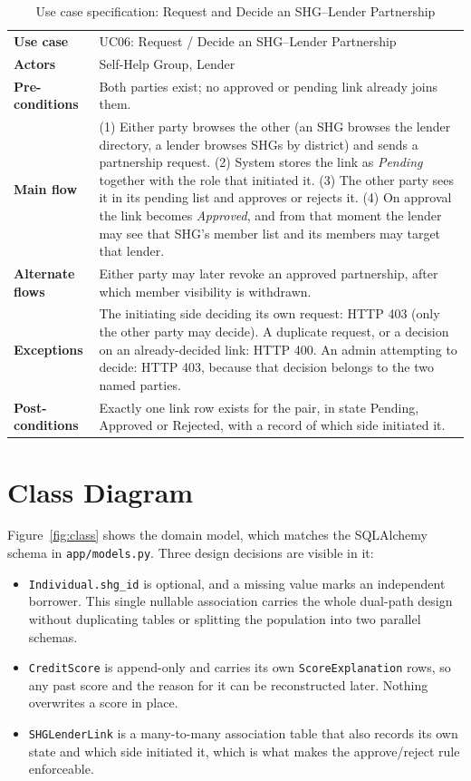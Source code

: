 \documentclass[11pt,a4paper]{article}
\newcommand{\code}[1]{\texttt{\small #1}}
\begin{document}
\begin{table}[H]
\centering
\caption{Use case specification: Request and Decide an SHG--Lender Partnership}
\label{tab:uc6}
\small
\begin{tabular}{@{}L{3.1cm}L{11.3cm}@{}}
\toprule
\textbf{Use case} & UC06: Request / Decide an SHG--Lender Partnership\\
\textbf{Actors} & Self-Help Group, Lender\\
\textbf{Pre-conditions} & Both parties exist; no approved or pending link already joins them.\\
\textbf{Main flow} & (1) Either party browses the other (an SHG browses the lender directory, a lender browses SHGs by district) and sends a partnership request. (2) System stores the link as \emph{Pending} together with the role that initiated it. (3) The other party sees it in its pending list and approves or rejects it. (4) On approval the link becomes \emph{Approved}, and from that moment the lender may see that SHG's member list and its members may target that lender.\\
\textbf{Alternate flows} & Either party may later revoke an approved partnership, after which member visibility is withdrawn.\\
\textbf{Exceptions} & The initiating side deciding its own request: HTTP 403 (only the other party may decide). A duplicate request, or a decision on an already-decided link: HTTP 400. An admin attempting to decide: HTTP 403, because that decision belongs to the two named parties.\\
\textbf{Post-conditions} & Exactly one link row exists for the pair, in state Pending, Approved or Rejected, with a record of which side initiated it.\\
\bottomrule
\end{tabular}
\end{table}

\clearpage
\section{Class Diagram}
\label{sec:class-diagram}

Figure~\ref{fig:class} shows the domain model, which matches the
SQLAlchemy schema in \code{app/models.py}. Three design decisions are
visible in it:

\begin{itemize}
  \item \code{Individual.shg\_id} is optional, and a missing value marks an
  independent borrower. This single nullable association carries the whole
  dual-path design without duplicating tables or splitting the population
  into two parallel schemas.
  \item \code{CreditScore} is append-only and carries its own
  \code{ScoreExplanation} rows, so any past score and the reason for it can
  be reconstructed later. Nothing overwrites a score in place.
  \item \code{SHGLenderLink} is a many-to-many association table that also
  records its own state and which side initiated it, which is what makes
  the approve/reject rule enforceable.
\end{itemize}
\end{document}
